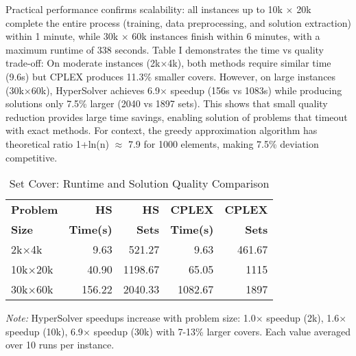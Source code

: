 \documentclass[conference]{IEEEtran}
\begin{document}
Practical performance confirms scalability: all instances up to 10k \(\times\) 20k complete the entire process (training, data preprocessing, and solution extraction) within 1 minute, while 30k \(\times\) 60k instances finish within 6 minutes, with a maximum runtime of 338 seconds. Table I demonstrates the time vs quality trade-off: On moderate instances (2k\(\times\)4k), both methods require similar time (9.6s) but CPLEX produces 11.3\% smaller covers. However, on large instances (30k\(\times\)60k), HyperSolver achieves 6.9\(\times\) speedup (156s vs 1083s) while producing solutions only 7.5\% larger (2040 vs 1897 sets). This shows that small quality reduction provides large time savings, enabling solution of problems that timeout with exact methods. For context, the greedy approximation algorithm has theoretical ratio 1+ln(n) \(\approx\) 7.9 for 1000 elements, making 7.5\% deviation competitive.

\begin{table}[htbp]
\centering
\caption{Set Cover: Runtime and Solution Quality Comparison}
\label{tab:setcover}
\footnotesize
\setlength{\tabcolsep}{6pt}
\begin{tabular}{|l|r|r|r|r|}
\hline
\textbf{Problem} & \textbf{HS} & \textbf{HS} & \textbf{CPLEX} & \textbf{CPLEX} \\
\textbf{Size} & \textbf{Time(s)} & \textbf{Sets} & \textbf{Time(s)} & \textbf{Sets} \\
\hline
2k\(\times\)4k & 9.63 & 521.27 & 9.63 & 461.67 \\
10k\(\times\)20k & 40.90 & 1198.67 & 65.05 & 1115 \\
30k\(\times\)60k & 156.22 & 2040.33 & 1082.67 & 1897 \\
\hline
\end{tabular}
\begin{flushleft}
\vspace{1pt}
\footnotesize
\textit{Note:} HyperSolver speedups increase with problem size: 1.0\(\times\) speedup (2k), 1.6\(\times\) speedup (10k), 6.9\(\times\) speedup (30k) with 7-13\% larger covers. Each value averaged over 10 runs per instance.
\end{flushleft}
\end{table} 
\end{document}
